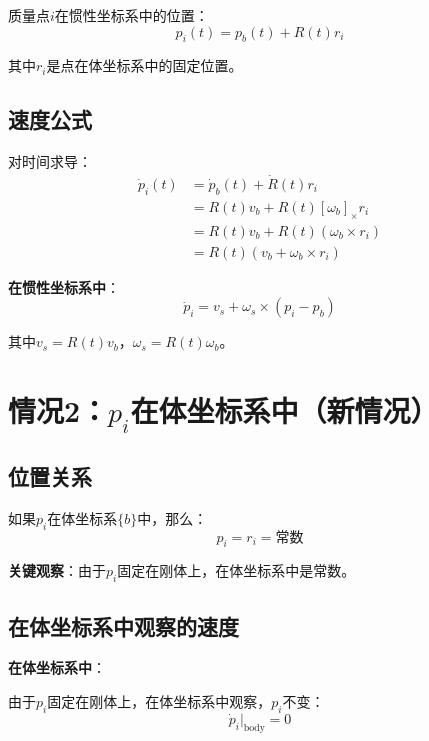 \documentclass[12pt,a4paper]{article}
\begin{document}
质量点$i$在惯性坐标系中的位置：
\begin{equation}
p_i(t) = p_b(t) + R(t) r_i
\label{eq:position_inertial}
\end{equation}

其中$r_i$是点在体坐标系中的固定位置。

\subsection{速度公式}

对时间求导：
\begin{align}
\dot{p}_i(t) &= \dot{p}_b(t) + \dot{R}(t) r_i \\
&= R(t) v_b + R(t) [\omega_b]_{\times} r_i \\
&= R(t) v_b + R(t) (\omega_b \times r_i) \\
&= R(t) (v_b + \omega_b \times r_i)
\end{align}

\textbf{在惯性坐标系中}：
\begin{equation}
\dot{p}_i = v_s + \omega_s \times (p_i - p_b)
\end{equation}

其中$v_s = R(t) v_b$，$\omega_s = R(t) \omega_b$。

\section{情况2：$p_i$在体坐标系中（新情况）}

\subsection{位置关系}

如果$p_i$在体坐标系$\{b\}$中，那么：
\begin{equation}
p_i = r_i = \text{常数}
\label{eq:position_body}
\end{equation}

\textbf{关键观察}：由于$p_i$固定在刚体上，在体坐标系中是常数。

\subsection{在体坐标系中观察的速度}

\textbf{在体坐标系中}：

由于$p_i$固定在刚体上，在体坐标系中观察，$p_i$不变：
\begin{equation}
\dot{p}_i\Big|_{\text{body}} = 0
\end{equation}
\end{document}
